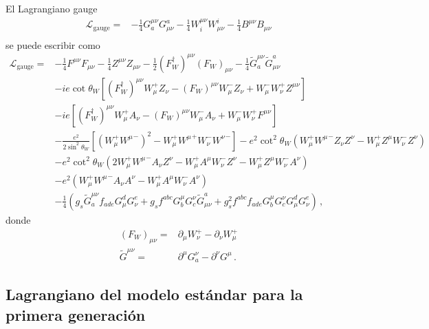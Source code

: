 \begin{frame}
El Lagrangiano gauge
\begin{align}
  \mathcal{L}_{\text{gauge}}=& -\tfrac{1}{4}G^{\mu\nu}_a G_{\mu\nu}^a-\tfrac{1}{4}W^{\mu\nu}_i W_{\mu\nu}^i-\tfrac{1}{4}B^{\mu\nu} B_{\mu\nu}\nonumber\\
\end{align}
se puede escribir como
\begin{align}
\label{eq:lgaguefin}
\mathcal{L}_{\text{gauge}}=&  -\tfrac{1}{4}F^{\mu\nu} F_{\mu\nu}-\tfrac{1}{4}Z^{\mu\nu} Z_{\mu\nu}-\tfrac{1}{2}(F_W^\dagger)^{\mu\nu} (F_W)_{\mu\nu}
- \tfrac{1}{4}\widetilde{G}^{\mu\nu}_a \widetilde{G}_{\mu\nu}^a\nonumber\\
&-ie\cot\theta_W\left[(F_W^\dagger)^{\mu\nu}W_\mu^+ Z_\nu-(F_W)^{\mu\nu}W_\mu^- Z_\nu+W_\mu^-W_\nu^+Z^{\mu\nu}\right]\nonumber\\
&-ie\left[(F_W^\dagger)^{\mu\nu}W_\mu^+ A_\nu-(F_W)^{\mu\nu}W_\mu^- A_\nu+W_\mu^-W_\nu^+F^{\mu\nu}\right]\nonumber\\
&-\frac{e^2}{2\sin^2\theta_W}\left[\left(W_\mu^+{W^\mu}^-\right)^2-W_\mu^+{W^\mu}^+W_\nu^-{W^\nu}^-\right]
-e^2\cot^2\theta_W\left(W_\mu^+{W^\mu}^-Z_\nu Z^\nu-W_\mu^+Z^\mu W_\nu^-Z^\nu\right)\nonumber\\
&-e^2\cot^2\theta_W\left(2W_\mu^+{W^\mu}^-A_\nu Z^\nu-W_\mu^+A^\mu W_\nu^-Z^\nu-W_\mu^+Z^\mu W_\nu^-A^\nu\right)\nonumber\\
&-e^2\left(W_\mu^+{W^\mu}^-A_\nu A^\nu-W_\mu^+A^\mu W_\nu^-A^\nu\right)\nonumber\\
&- \frac{1}{4}\left(g_s\widetilde{G}^{\mu\nu}_af_{a d e}G^d_\mu G^e_\nu
    +g_sf^{a b c}G_b^\mu G_c^\nu\widetilde{G}_{\mu\nu}^a
    +g_s^2f^{a b c}f_{a d e}G_b^\mu G_c^\nu G^d_\mu G^e_\nu\right)\,,
\end{align}
donde
\begin{align}
  (F_W)_{\mu\nu}=&\partial_\mu W^+_\nu-\partial_\nu W^+_\mu\nonumber\\
  \widetilde{G}^{\mu\nu}=&\partial^\mu G^\nu_a-\partial^\nu G^\mu\,.
\end{align}

\end{frame}

\subsection{Lagrangiano del modelo estándar para la primera generación}


